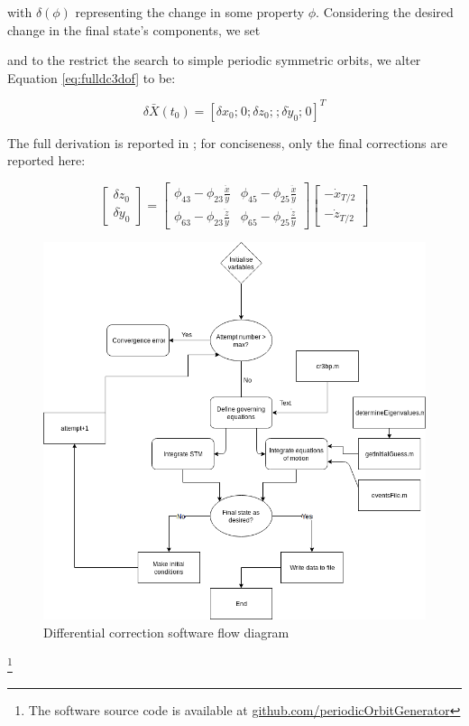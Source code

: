\noindent with $\delta\left(\phi\right)$ representing the change in some property $\phi$. Considering the desired change in the final state's components, we set 


\noindent and to the restrict the search to simple periodic symmetric orbits, we alter Equation \ref{eq:fulldc3dof} to be:

\[
	\delta \bar X \left( t_0 \right) = [\delta x_0; \hspace{1pt} 0; \delta z_0; \hspace{1pt}; \delta\dot{y}_0; \hspace{1pt} 0]^T
\]

The full derivation is reported in \citep{Parker2014}; for conciseness, only the final corrections are reported here:

\[
	\begin{bmatrix}
		\delta z_0 \\
		\delta \dot{y}_0
	\end{bmatrix}
	=
	\begin{bmatrix}
		\phi_{43} - \phi_{23} \frac{\ddot{x}}{\dot{y}} & \phi_{45} - \phi_{25}\frac{\ddot{x}}{\dot{y}} \\
		\phi_{63} - \phi_{23} \frac{\ddot{z}}{\dot{y}} & \phi_{65} - \phi_{25}\frac{\ddot{z}}{\dot{y}}
	\end{bmatrix}
	\begin{bmatrix}
		-\dot{x}_{T/2}\\
		-\dot{z}_{T/2}
	\end{bmatrix}
\]

\begin{figure}
\centering
\includegraphics[height=.4\textheight]{figures/differentialCorrectorFlow}
\caption{Differential correction software flow diagram}
\label{f:differentialcorrectorflow}
\end{figure}

 \footnote{The software source code is available at \url{github.com/periodicOrbitGenerator}}

